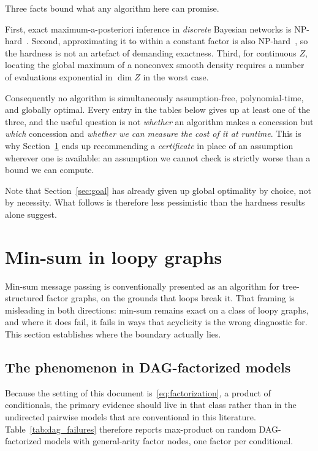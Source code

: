 Three facts bound what any algorithm here can promise.

First, exact maximum-a-posteriori inference in \emph{discrete} Bayesian networks is NP-hard~\citep{Shimony1994}. Second, approximating it to within a constant factor is also NP-hard~\citep{Abdelbar1998}, so the hardness is not an artefact of demanding exactness. Third, for continuous $Z$, locating the global maximum of a nonconvex smooth density requires a number of evaluations exponential in $\dim Z$ in the worst case.

Consequently no algorithm is simultaneously assumption-free, polynomial-time, and globally optimal. Every entry in the tables below gives up at least one of the three, and the useful question is not \emph{whether} an algorithm makes a concession but \emph{which} concession and \emph{whether we can measure the cost of it at runtime}. This is why Section~\ref{sec:minsum} ends up recommending a \emph{certificate} in place of an assumption wherever one is available: an assumption we cannot check is strictly worse than a bound we can compute.

Note that Section~\ref{sec:goal} has already given up global optimality by choice, not by necessity. What follows is therefore less pessimistic than the hardness results alone suggest.

\section{Min-sum in loopy graphs}
\label{sec:minsum}

Min-sum message passing is conventionally presented as an algorithm for tree-structured factor graphs, on the grounds that loops break it. That framing is misleading in both directions: min-sum remains exact on a class of loopy graphs, and where it does fail, it fails in ways that acyclicity is the wrong diagnostic for. This section establishes where the boundary actually lies.

\subsection{The phenomenon in DAG-factorized models}
\label{sec:dag_failures}

Because the setting of this document is~\eqref{eq:factorization}, a product of conditionals, the primary evidence should live in that class rather than in the undirected pairwise models that are conventional in this literature. Table~\ref{tab:dag_failures} therefore reports max-product on random DAG-factorized models with general-arity factor nodes, one factor per conditional.

